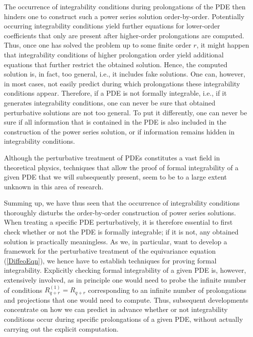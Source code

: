 The occurrence of integrability conditions during prolongations of the PDE then hinders one to construct such a power series solution order-by-order. Potentially occurring integrability conditions yield further equations for lower-order coefficients that only are present after higher-order prolongations are computed. Thus, once one has solved the problem up to some finite order $r$, it might happen that integrability conditions of higher prolongation order yield additional equations that further restrict the obtained solution. 
Hence, the computed solution is, in fact, too general, i.e., it includes fake solutions.
One can, however, in most cases, not easily predict during which prolongations these integrability conditions appear. Therefore, if a PDE is not formally integrable, i.e., if it generates integrability conditions, one can never be sure that obtained perturbative solutions are not too general. To put it differently, one can never be sure if all information that is contained in the PDE is also included in the construction of the power series solution, or if information remains hidden in integrability conditions.

Although the perturbative treatment of PDEs constitutes a vast field in theoretical physics, techniques that allow the proof of formal integrability of a given PDE that we will subsequently present, seem to be to a large extent unknown in this area of research. 

Summing up, we have thus seen that the occurrence of integrability conditions thoroughly disturbs the order-by-order construction of power series solutions. When treating a specific PDE perturbatively, it is therefore essential to first check whether or not the PDE is formally integrable; if it is not, any obtained solution is practically meaningless.
As we, in particular, want to develop a framework for the perturbative treatment of the equivariance equation (\ref{DiffeoEqn}), we hence have to establish techniques for proving formal integrability.
Explicitly checking formal integrability of a given PDE is, however, extensively involved, as in principle one would need to probe the infinite number of conditions $R_{q+r}^{(1)} = R_{q+r}$ corresponding to an infinite number of prolongations and projections that one would need to compute. Thus, subsequent developments concentrate on how we can predict in advance whether or not integrability conditions occur during specific prolongations of a given PDE, without actually carrying out the explicit computation.

